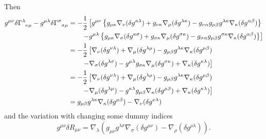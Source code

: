 \documentclass{article}
\theoremstyle{definition}
\def\t{\tensor}
\begin{document}
Then 
\begin{align}
    g^{\mu\nu} \delta \t{\Gamma}{^\lambda_\nu_\mu} - g^{\mu\lambda} \delta \t{\Gamma}{^\sigma_\sigma_\mu} &= -\frac{1}{2} \left[g^{\mu\nu} \left\{g_{\mu\kappa} \nabla_\nu (\delta g^{\kappa \lambda}) + g_{\nu\kappa}\nabla_\mu (\delta g^{\lambda \kappa}) - g_{\nu\alpha}g_{\mu\beta} g^{\lambda\kappa} \nabla_\kappa (\delta g^{\alpha\beta}) \right\} \right. \nonumber\\
                                                                                                          &\qquad \left. - g^{\mu\lambda} \left\{g_{\mu\kappa} \nabla_\sigma (\delta g^{\kappa \sigma}) + g_{\sigma\kappa}\nabla_\mu (\delta g^{\sigma \kappa}) - g_{\sigma\alpha}g_{\mu\beta} g^{\sigma\kappa} \nabla_\kappa (\delta g^{\alpha\beta}) \right\} \right] \\
                                                                                                          &= -\frac{1}{2} \left[  \nabla_\nu (\delta g^{\nu \lambda}) + \nabla_\mu (\delta g^{\lambda \mu}) - g_{\mu\beta} g^{\lambda\kappa} \nabla_\kappa (\delta g^{\mu\beta})  \right. \nonumber\\
                                                                                                          &\qquad \left. -   \nabla_\sigma (\delta g^{\lambda \sigma}) - g^{\mu\lambda} g_{\sigma\kappa}\nabla_\mu (\delta g^{\sigma \kappa}) +  \nabla_\kappa (\delta g^{\kappa\lambda})  \right] \\
                                                                                                          &= -\frac{1}{2} \left[  \nabla_\nu (\delta g^{\nu \lambda}) + \nabla_\mu (\delta g^{\lambda \mu}) - g_{\mu\beta} g^{\lambda\kappa} \nabla_\kappa (\delta g^{\mu\beta})  \right. \nonumber\\
                                                                                                          &\qquad \left. -   \nabla_\mu (\delta g^{\lambda \mu}) - g^{\kappa\lambda} g_{\mu\beta}\nabla_\kappa (\delta g^{\mu \beta}) +  \nabla_\kappa (\delta g^{\kappa\lambda})  \right] \\
                                                                                                          &= g_{\mu\beta} g^{\lambda\kappa} \nabla_\kappa (\delta g^{\mu\beta}) - \nabla_\nu (\delta g^{\nu \lambda})  \nonumber\\
\end{align}
and the variation with changing some dummy indices 
\begin{equation}
    g^{\mu\nu} \delta R_{\mu\nu} = \nabla_\lambda \left(    g_{\mu\nu} g^{\lambda\sigma} \nabla_\sigma (\delta g^{\mu\nu}) - \nabla_\rho (\delta g^{\rho \lambda}) \right).
\end{equation} 
\end{document}
